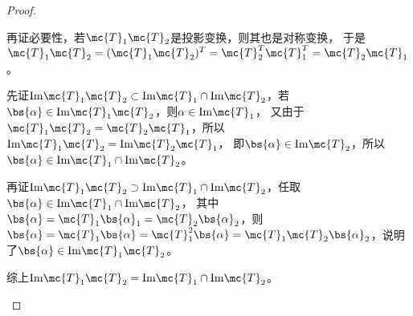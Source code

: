 \documentclass[12pt, a4paper, oneside, UTF8]{ctexbook}
\begin{document}
\begin{proof}
\begin{enumerate}[label=(\arabic*)]
        再证必要性，若$\mc{T}_1\mc{T}_2$是投影变换，则其也是对称变换，
        于是$\mc{T}_1\mc{T}_2=(\mc{T}_1\mc{T}_2)^T=\mc{T}_2^T\mc{T}_1^T=\mc{T}_2\mc{T}_1$。

        先证$\mathrm{Im}\mc{T}_1\mc{T}_2 \subset \mathrm{Im}\mc{T}_1 \cap \mathrm{Im}\mc{T}_2$，若$\bs{\alpha} \in \mathrm{Im}{\mc{T}_1\mc{T}_2}$，则$\alpha \in \mathrm{Im}\mc{T}_1$，
        又由于$\mc{T}_1\mc{T}_2=\mc{T}_2\mc{T}_1$，所以$\mathrm{Im}\mc{T}_1\mc{T}_2=\mathrm{Im}\mc{T}_2\mc{T}_1$，
        即$\bs{\alpha} \in \mathrm{Im}\mc{T}_2$，所以$\bs{\alpha} \in \mathrm{Im}\mc{T}_1 \cap \mathrm{Im}\mc{T}_2$。

        再证$\mathrm{Im}\mc{T}_1\mc{T}_2 \supset \mathrm{Im}\mc{T}_1 \cap \mathrm{Im}\mc{T}_2$，任取$\bs{\alpha} \in \mathrm{Im}\mc{T}_1 \cap \mathrm{Im}\mc{T}_2$，
        其中$\bs{\alpha}=\mc{T}_1\bs{\alpha}_1=\mc{T}_2\bs{\alpha}_2$，则
        $\bs{\alpha}=\mc{T}_1\bs{\alpha}=\mc{T}_1^2\bs{\alpha}=\mc{T}_1\mc{T}_2\bs{\alpha}_2$，说明了$\bs{\alpha} \in \mathrm{Im}\mc{T}_1\mc{T}_2$。
        
        综上$\mathrm{Im}\mc{T}_1\mc{T}_2 = \mathrm{Im}\mc{T}_1 \cap \mathrm{Im}\mc{T}_2$。
        

    \end{enumerate}
\end{proof}
\ifx\allfiles\undefined
\end{document}
